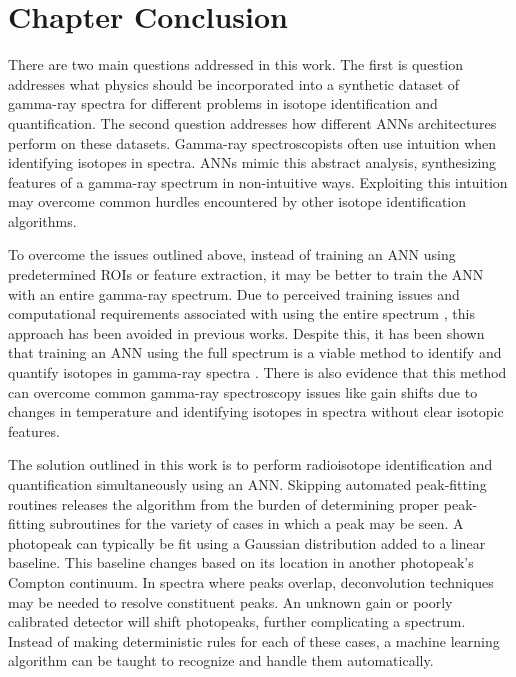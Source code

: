
\section{Chapter Conclusion}

There are two main questions addressed in this work. The first is question addresses what physics should be incorporated into a synthetic dataset of gamma-ray spectra for different problems in isotope identification and quantification. The second question addresses how different ANNs architectures perform on these datasets. Gamma-ray spectroscopists often use intuition when identifying isotopes in spectra. ANNs mimic this abstract analysis, synthesizing features of a gamma-ray spectrum in non-intuitive ways. Exploiting this intuition may overcome common hurdles encountered by other isotope identification algorithms.

To overcome the issues outlined above, instead of training an ANN using predetermined ROIs or feature extraction, it may be better to train the ANN with an entire gamma-ray spectrum. Due to perceived training issues and computational requirements associated with using the entire spectrum \cite{Pilato1999,Yoshida2002}, this approach has been avoided in previous works. Despite this, it has been shown that training an ANN using the full spectrum is a viable method to identify and quantify isotopes in gamma-ray spectra \cite{kamuda2017,kamudaThesis2017,kamuda2018}. There is also evidence that this method can overcome common  gamma-ray spectroscopy issues like gain shifts due to changes in temperature and identifying isotopes in spectra without clear isotopic features.

The solution outlined in this work is to perform radioisotope identification and quantification simultaneously using an ANN. Skipping automated peak-fitting routines releases the algorithm from the burden of determining proper peak-fitting subroutines for the variety of cases in which a peak may be seen. A photopeak can typically be fit using a Gaussian distribution added to a linear baseline. This baseline changes based on its location in another photopeak's Compton continuum. In spectra where peaks overlap, deconvolution techniques may be needed to resolve constituent peaks. An unknown gain or poorly calibrated detector will shift photopeaks, further complicating a spectrum. Instead of making deterministic rules for each of these cases, a machine learning algorithm can be taught to recognize and handle them automatically.

